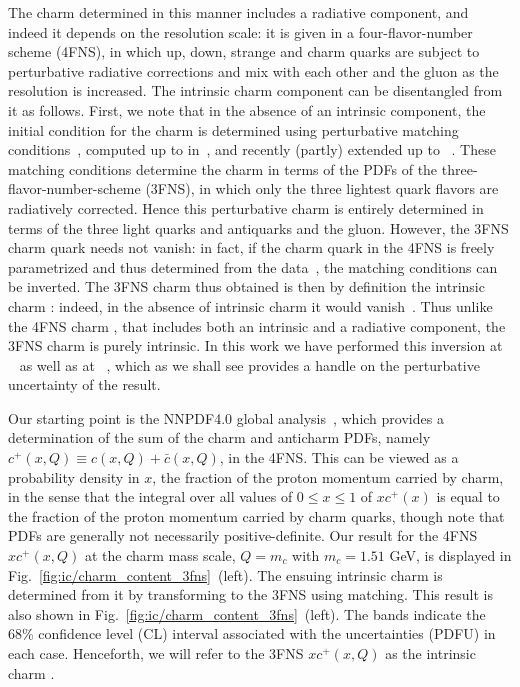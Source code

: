 The charm \pdf determined in this manner includes a  radiative component, and
indeed it depends on the resolution scale: it is  given in a four-flavor-number
scheme (4FNS), in which up,  down, strange and charm quarks are subject to 
perturbative radiative corrections and mix with each other and the gluon as the
resolution is increased.
%
The intrinsic charm component can be disentangled from it as follows.
%
First, we note that in the absence of an intrinsic component, the initial
condition for the charm \pdf is determined using perturbative matching
conditions~\cite{Collins:1986mp}, computed  up to \nnlo in~\cite{pdfnnlo},
and recently (partly) extended up to \nnnlo~\cite{Bierenbaum:2009zt,Bierenbaum:2009mv,Ablinger:2010ty,Ablinger:2014vwa,Ablinger:2014uka,Behring:2014eya,Ablinger_2014,Ablinger:2014nga,Blumlein:2017wxd}.
%
These matching conditions  determine the charm \pdf in terms of the PDFs of the
three-flavor-number-scheme (3FNS), in which only the three lightest quark 
flavors are radiatively corrected.
%
Hence this perturbative charm \pdf is entirely determined in terms of the three
light quarks and antiquarks and the gluon.
%
However, the 3FNS charm quark \pdf needs not
vanish: in fact, if the charm quark \pdf in the 4FNS is freely
parametrized and thus determined from the data~\cite{Ball:2015tna},
the matching conditions can be inverted.
%
The 3FNS charm \pdf
thus obtained is then by definition the intrinsic charm \pdf: indeed, in
the absence of intrinsic charm it would vanish~\cite{Ball:2015dpa}. 
Thus unlike the 4FNS charm \pdf, that
includes both an intrinsic and a radiative
component, the 3FNS charm
\pdf is purely intrinsic.
%
In this work we have performed this inversion at
\nnlo~\cite{pdfnnlo} as well as at \nnnlo~\cite{Bierenbaum:2009zt,Bierenbaum:2009mv,Ablinger:2010ty,Ablinger:2014vwa,Ablinger:2014uka,Behring:2014eya,Ablinger_2014,Ablinger:2014nga,Blumlein:2017wxd},
which as we shall see provides a handle on the perturbative uncertainty of the \nnlo result.

Our starting point is the NNPDF4.0 global
analysis~\cite{Ball:2021leu}, which provides a determination of
the sum of the charm and
anticharm PDFs, namely  $c^+(x,Q)\equiv c(x,Q)+\bar  c(x,Q)$, in the
4FNS. 
This can be viewed 
as a probability density in $x$, the fraction of the proton momentum
carried by charm, in the sense that the integral over all 
values of $0\le x\le1$ of 
$xc^+(x)$ is equal to  the fraction of
the proton momentum carried by charm quarks, though note that PDFs are
generally not necessarily positive-definite. 
%
Our result for  the 4FNS $xc^+(x,Q)$  at
the charm mass scale, $Q=m_c$ with $m_c=1.51$ GeV, 
is displayed in Fig.~\ref{fig:ic/charm_content_3fns}~(left).
%
%
The ensuing intrinsic charm is determined from it
by transforming to the 3FNS using
\nnlo matching.
%
This result is also shown 
in Fig.~\ref{fig:ic/charm_content_3fns}~(left).
The bands  indicate the 68\% confidence level (CL) interval
associated with the \pdf uncertainties  (PDFU) in each case.  Henceforth, we will refer to
the  3FNS $xc^+(x,Q)$ \pdf as the
intrinsic charm \pdf. 

